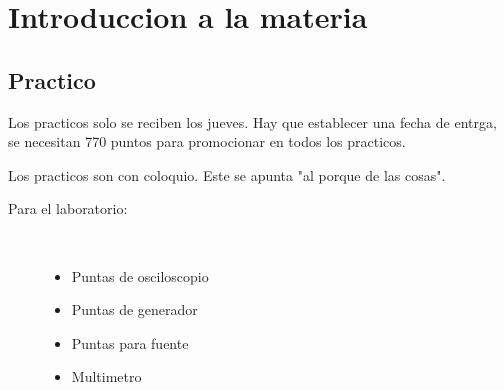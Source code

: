 \chapter*{Introduccion a la materia}
\section*{Practico}
Los practicos solo se reciben los jueves. Hay que establecer una fecha de entrga, 
se necesitan 770 puntos para promocionar en todos los practicos.

Los practicos son con coloquio. Este se apunta "al porque de las cosas".

\begin{description}
  \item[Para el laboratorio:] \hline \\ 
    \begin{itemize}
      \item Puntas de osciloscopio
      \item Puntas de generador
      \item Puntas para fuente
      \item Multimetro
    \end{itemize}
\end{description}

